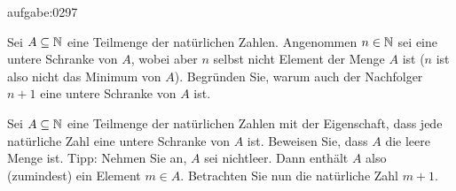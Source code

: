 \begin{aufgabe}{aufgabe:0297}
    \begin{aenum}
        \item Sei $A\subseteq\mathbb{N}$ eine Teilmenge der natürlichen Zahlen. Angenommen $n\in\mathbb{N}$ sei eine untere Schranke von $A$, wobei aber $n$ selbst nicht Element der Menge $A$ ist ($n$ ist also nicht das Minimum von $A$). Begründen Sie, warum auch der Nachfolger $n+1$ eine untere Schranke von $A$ ist.
        \item Sei $A\subseteq\mathbb{N}$ eine Teilmenge der natürlichen Zahlen mit der Eigenschaft, dass jede natürliche Zahl eine untere Schranke von $A$ ist. Beweisen Sie, dass $A$ die leere Menge ist. Tipp: Nehmen Sie an, $A$ sei nichtleer. Dann enthält $A$ also (zumindest) ein Element $m\in A$. Betrachten Sie nun die natürliche Zahl $m+1$.
    \end{aenum}
\end{aufgabe}


